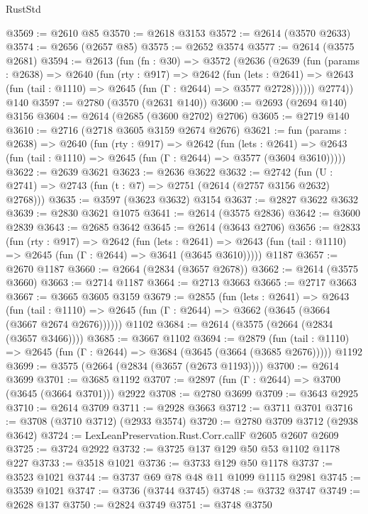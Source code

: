 \begin{lexlean}{RustStd}
\begin{coremodule}
@3569 := @2610 @85
@3570 := @2618 @3153
@3572 := @2614 (@3570 @2633)
@3574 := @2656 (@2657 @85)
@3575 := @2652 @3574
@3577 := @2614 (@3575 @2681)
@3594 := @2613
    (fun (fn : @30) =>
    @3572
      (@2636
        (@2639
          (fun (params : @2638) =>
          @2640
            (fun (rty : @917) =>
            @2642
              (fun (lets : @2641) =>
              @2643 (fun (tail : @1110) => @2645 (fun (Γ : @2644) => @3577 @2728))))))
        @2774))
    @140
@3597 := @2780 (@3570 (@2631 @140))
@3600 := @2693 (@2694 @140) @3156
@3604 := @2614 (@2685 (@3600 @2702) @2706)
@3605 := @2719 @140
@3610 := @2716 (@2718 @3605 @3159 @2674 @2676)
@3621 := fun (params : @2638) =>
  @2640
    (fun (rty : @917) =>
    @2642
      (fun (lets : @2641) =>
      @2643 (fun (tail : @1110) => @2645 (fun (Γ : @2644) => @3577 (@3604 @3610)))))
@3622 := @2639 @3621
@3623 := @2636 @3622
@3632 := @2742 (fun (U : @2741) => @2743 (fun (t : @7) => @2751 (@2614 (@2757 @3156 @2632) @2768)))
@3635 := @3597 (@3623 @3632) @3154
@3637 := @2827 @3622 @3632
@3639 := @2830 @3621 @1075
@3641 := @2614 (@3575 @2836)
@3642 := @3600 @2839
@3643 := @2685 @3642
@3645 := @2614 (@3643 @2706)
@3656 := @2833
    (fun (rty : @917) =>
    @2642
      (fun (lets : @2641) =>
      @2643 (fun (tail : @1110) => @2645 (fun (Γ : @2644) => @3641 (@3645 @3610)))))
    @1187
@3657 := @2670 @1187
@3660 := @2664 (@2834 (@3657 @2678))
@3662 := @2614 (@3575 @3660)
@3663 := @2714 @1187
@3664 := @2713 @3663
@3665 := @2717 @3663
@3667 := @3665 @3605 @3159
@3679 := @2855
    (fun (lets : @2641) =>
    @2643
      (fun (tail : @1110) => @2645 (fun (Γ : @2644) => @3662 (@3645 (@3664 (@3667 @2674 @2676))))))
    @1102
@3684 := @2614 (@3575 (@2664 (@2834 (@3657 @3466))))
@3685 := @3667 @1102
@3694 := @2879
    (fun (tail : @1110) => @2645 (fun (Γ : @2644) => @3684 (@3645 (@3664 (@3685 @2676)))))
    @1192
@3699 := @3575 (@2664 (@2834 (@3657 (@2673 @1193))))
@3700 := @2614 @3699
@3701 := @3685 @1192
@3707 := @2897 (fun (Γ : @2644) => @3700 (@3645 (@3664 @3701))) @2922
@3708 := @2780 @3699
@3709 := @3643 @2925
@3710 := @2614 @3709
@3711 := @2928 @3663
@3712 := @3711 @3701
@3716 := @3708 (@3710 @3712) (@2933 @3574)
@3720 := @2780 @3709 @3712 (@2938 @3642)
@3724 := LexLeanPreservation.Rust.Corr.callF @2605 @2607 @2609
@3725 := @3724 @2922
@3732 := @3725 @137 @129 @50 @53 @1102 @1178 @227
@3733 := @3518 @1021
@3736 := @3733 @129 @50 @1178
@3737 := @3523 @1021
@3744 := @3737 @69 @78 @48 @11 @1099 @1115 @2981
@3745 := @3539 @1021
@3747 := @3736 (@3744 @3745)
@3748 := @3732 @3747
@3749 := @2628 @137
@3750 := @2824 @3749
@3751 := @3748 @3750

\end{coremodule}
\end{lexlean}
